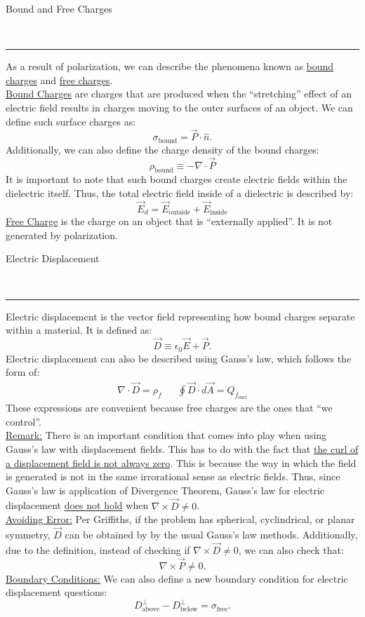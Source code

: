 \documentclass{article}
\newcommand{\header}[1]{\begin{large}\noindent #1\end{large}\\\rule{\textwidth}{0.5pt}}
\newcommand{\gap}{\medskip\\}
\newcommand{\sheader}[1]{\underline{#1:}}
\begin{document}
\pagebreak

\header{Bound and Free Charges}

As a result of polarization, we can describe the phenomena known as \underline{bound charges}
and \underline{free charges}. 
\gap
\underline{Bound Charges} are charges that are produced when the ``stretching'' effect
of an electric field results in charges moving to the outer surfaces of an object. We 
can define such surface charges as:
\[
    \sigma_\textrm{bound} = \vec{P} \cdot \hat{n}.    
\]
Additionally, we can also define the charge density of the bound charges:
\[
    \rho_\textrm{bound} \equiv -\nabla \cdot \vec{P}    
\]
It is important to note that such bound charges create electric fields within the dielectric
itself. Thus, the total electric field inside of a dielectric is described by:
\[
    \vec{E}_d = \vec{E}_\textrm{outside} + \vec{E}_\textrm{inside}    
\]
\underline{Free Charge} is the charge on an object that is ``externally applied''. It 
is not generated by polarization.
\gap
\header{Electric Displacement}

Electric displacement is the vector field representing how bound charges separate within 
a material. It is defined as:
\[
    \vec{D} \equiv \epsilon_0 \vec{E} + \vec{P}.    
\]
Electric displacement can also be described using Gauss's law, which follows the form of:
\begin{align*}
    \nabla \cdot \vec{D} = \rho_f && \oint\vec{D} \cdot d\vec{A} = Q_{f_\textrm{encl}}
\end{align*}
These expressions are convenient because free charges are the ones that ``we control''.
\gap
\sheader{Remark} There is an important condition that comes into play when using Gauss's
law with displacement fields. This has to do with the fact that \underline{the curl of a displacement field is not always zero}.
This is because the way in which the field is generated is not in the same irrorational
sense as electric fields. Thus, since Gauss's law is application of Divergence Theorem, 
Gauss's law for electric displacement \underline{does not hold} when $\nabla \times \vec{D} \neq 0$.
\gap
\sheader{Avoiding Error} Per Griffiths, if the problem has spherical, cyclindrical, or planar
symmetry, $\vec{D}$ can be obtained by by the usual Gauss's law methods. Additionally,
due to the definition, instead of checking if $\nabla \times \vec{D} \neq 0$, we can also check
that:
\[
    \nabla \times \vec{P} \neq 0.
\]
\sheader{Boundary Conditions} We can also define a new boundary condition for electric displacement
questions:
\[
    D_\textrm{above}^\perp - D_\textrm{below}^\perp = \sigma_\textrm{free}.
\]
\end{document}

